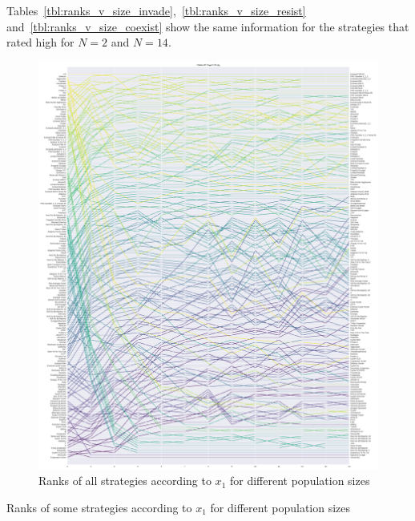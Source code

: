 \documentclass{article}
\begin{document}
Tables~\ref{tbl:ranks_v_size_invade},~\ref{tbl:ranks_v_size_resist}
and~\ref{tbl:ranks_v_size_coexist} show the same information for the strategies
that rated high for \(N=2\) and \(N=14\).

\begin{figure}[!hbtp]
    \centering
    \includegraphics[height=.9\textheight]{./img/average_rank_vs_population_size_invade.pdf}
    \caption{Ranks of all strategies according to \(x_1\) for different
    population sizes}
    \label{fig:ranks_v_size_invade}
\end{figure}

\begin{table}[!hbtp]
    \centering
    \scriptsize
    
    \caption{Ranks of some strategies according to \(x_1\) for different
    population sizes}
    \label{tbl:ranks_v_size_invade}
\end{table}
\end{document}
